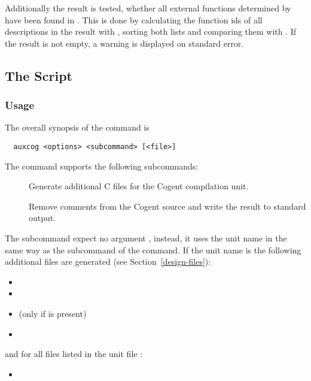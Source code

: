 Additionally the result is tested, whether all external functions determined by  have been found in 
. This is done by calculating the function ids of all descriptions in the result with , 
sorting both lists and comparing them with . If the result is not empty, a warning is displayed on standard error.

\subsection{The  Script}
\label{impl-all-auxcog}

\subsubsection{Usage}

The overall synopsis of the  command is
\begin{verbatim}
  auxcog <options> <subcommand> [<file>]
\end{verbatim}

The  command supports the following subcommands:
\begin{description}
\item[] Generate additional C files for the Cogent compilation unit.

\item[] Remove comments from the Cogent source  and write the result to standard output.

\end{description}

The subcommand  expect no argument , instead, it uses the unit name in the same way as the subcommand  
of the  command. If the unit name is  the following additional files are generated 
(see Section~\ref{design-files}):
\begin{itemize}
\item {}
\item {}
\item {} (only if  is present)
\item {}
\end{itemize}
and for all files  listed in the unit file :
\begin{itemize}
\item {}
\end{itemize}

